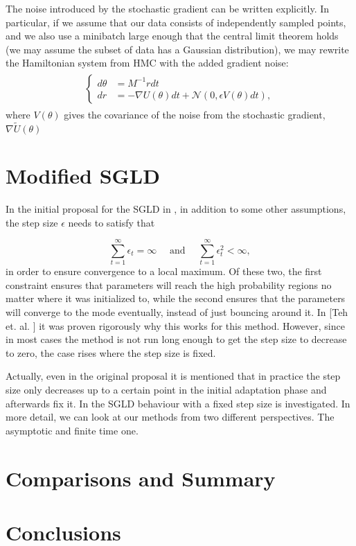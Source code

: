 \documentclass[11pt]{article}
\begin{document}
The noise introduced by the stochastic gradient can be written explicitly. In particular, if we assume that our data consists of independently sampled points, and we also use a minibatch large enough that the central limit theorem holds (we may assume the subset of data has a Gaussian distribution), we may rewrite the Hamiltonian system from HMC with the added gradient noise:
\begin{align}
\begin{split}
\begin{cases}
  d\theta &= M^{-1}r dt \\
  dr &= -\nabla U(\theta)dt + \mathcal{N}(0,\epsilon V(\theta)dt),
  \end{cases}
\end{split}
\end{align}
where $V(\theta)$ gives the covariance of the noise from the stochastic gradient, $\nabla\tilde{U}(\theta)$


\section{Modified SGLD}

In the initial proposal for the SGLD in \cite{Welling:2011:BLV:3104482.3104568}, in addition to some other assumptions, the step size $\epsilon$ needs to satisfy that

\begin{equation}
\sum_{t=1}^{\infty} \epsilon_{t}=\infty \quad \text{ and } \quad \sum_{t=1}^{\infty} \epsilon_{t}^{2}<\infty,
\end{equation}
in order to ensure convergence to a local maximum. Of these two, the first constraint ensures that parameters will reach the high probability regions no matter where it was initialized to, while the second ensures that the parameters will converge to the mode eventually, instead of just bouncing around it. 
In [Teh et. al. \cite{proofsgld}] it was proven rigorously why this works for this method. However, since in most cases the method is not run long enough to get the step size to decrease to zero, the case rises where the step size is fixed. 

Actually, even in the original proposal it is mentioned that in practice the step size only decreases up to a certain point in the initial adaptation phase and afterwards fix it. In \cite{JMLR:v17:15-494} the SGLD behaviour with a fixed step size is investigated. 
In more detail, we can look at our methods from two different perspectives. The asymptotic and finite time one. 


\section{Comparisons and Summary}


\section{Conclusions}




\end{document}
